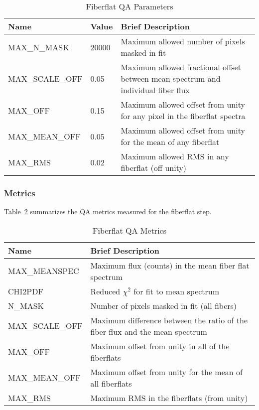 \documentclass[12pt]{article}
\begin{document}
\begin{table}[h]
\begin{center}
\caption{Fiberflat QA Parameters}
\label{tab:flat_param}
\begin{tabular}{p{3.5cm}p{1.2cm}p{8.3cm}}
\hline
{\bf Name} & {\bf Value} & {\bf Brief Description}\\
\hline
MAX\_N\_MASK    & 20000 & Maximum allowed number of pixels masked in fit \\
MAX\_SCALE\_OFF & 0.05  & Maximum allowed fractional offset between mean spectrum and individual fiber flux \\ 
MAX\_OFF        & 0.15  & Maximum allowed offset from unity for any pixel in the fiberflat spectra\\
MAX\_MEAN\_OFF  & 0.05  & Maximum allowed offset from unity for the mean of any fiberflat \\
MAX\_RMS        & 0.02  & Maximum allowed RMS in any fiberflat (off unity) \\
\hline
\end{tabular}
\end{center}
\end{table}



\subsubsection{Metrics}

Table~\ref{tab:flat_metrics} summarizes the QA metrics measured
for the fiberflat step.  

\begin{table}[h]
\begin{center}
\caption{Fiberflat QA Metrics}
\label{tab:flat_metrics}
\begin{tabular}{p{3.5cm}p{9.0cm}}
\hline
{\bf Name} & {\bf Brief Description}\\
\hline
MAX\_MEANSPEC   & Maximum flux (counts) in the mean fiber flat spectrum \\ 
CHI2PDF         & Reduced $\chi^2$ for fit to mean spectrum \\
N\_MASK         & Number of pixels masked in fit (all fibers) \\
MAX\_SCALE\_OFF & Maximum difference between the ratio of the fiber flux and 
  the mean spectrum \\
MAX\_OFF        & Maximum offset from unity in all of the fiberflats \\
MAX\_MEAN\_OFF  & Maximum offset from unity for the mean of all fiberflats \\
MAX\_RMS        & Maximum RMS in the fiberflats (from unity) \\
\hline
\end{tabular}
\end{center}
\end{table}
\end{document}
